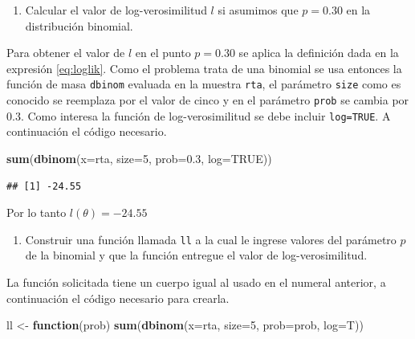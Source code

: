 \documentclass[10pt,]{krantz}
\makeatletter
\newenvironment{Shaded}{\begin{snugshade}}{\end{snugshade}}
\newcommand{\KeywordTok}[1]{\textcolor[rgb]{0.13,0.29,0.53}{\textbf{#1}}}
\newcommand{\DataTypeTok}[1]{\textcolor[rgb]{0.13,0.29,0.53}{#1}}
\newcommand{\DecValTok}[1]{\textcolor[rgb]{0.00,0.00,0.81}{#1}}
\newcommand{\FloatTok}[1]{\textcolor[rgb]{0.00,0.00,0.81}{#1}}
\newcommand{\StringTok}[1]{\textcolor[rgb]{0.31,0.60,0.02}{#1}}
\newcommand{\OtherTok}[1]{\textcolor[rgb]{0.56,0.35,0.01}{#1}}
\newcommand{\ControlFlowTok}[1]{\textcolor[rgb]{0.13,0.29,0.53}{\textbf{#1}}}
\newcommand{\NormalTok}[1]{#1}
\providecommand{\tightlist}{%
  \setlength{\itemsep}{0pt}\setlength{\parskip}{0pt}}
\newenvironment{kframe}{%
\medskip{}
\setlength{\fboxsep}{.8em}
 \def\at@end@of@kframe{}%
 \ifinner\ifhmode%
  \def\at@end@of@kframe{\end{minipage}}%
  \begin{minipage}{\columnwidth}%
 \fi\fi%
 \def\FrameCommand##1{\hskip\@totalleftmargin \hskip-\fboxsep
 \colorbox{shadecolor}{##1}\hskip-\fboxsep
     \hskip-\linewidth \hskip-\@totalleftmargin \hskip\columnwidth}%
 \MakeFramed {\advance\hsize-\width
   \@totalleftmargin\z@ \linewidth\hsize
   \@setminipage}}%
 {\par\unskip\endMakeFramed%
 \at@end@of@kframe}
\renewenvironment{Shaded}{\begin{kframe}}{\end{kframe}}
\makeatother
\begin{document}
\begin{enumerate}
\def\labelenumi{\arabic{enumi})}
\tightlist
\item
  Calcular el valor de log-verosimilitud \(l\) si asumimos que
  \(p=0.30\) en la distribución binomial.
\end{enumerate}

Para obtener el valor de \(l\) en el punto \(p=0.30\) se aplica la
definición dada en la expresión \eqref{eq:loglik}. Como el problema trata
de una binomial se usa entonces la función de masa \texttt{dbinom}
evaluada en la muestra \texttt{rta}, el parámetro \texttt{size} como es
conocido se reemplaza por el valor de cinco y en el parámetro
\texttt{prob} se cambia por 0.3. Como interesa la función de
log-verosimilitud se debe incluir \texttt{log=TRUE}. A continuación el
código necesario.

\begin{Shaded}
\begin{Highlighting}[]
\KeywordTok{sum}\NormalTok{(}\KeywordTok{dbinom}\NormalTok{(}\DataTypeTok{x=}\NormalTok{rta, }\DataTypeTok{size=}\DecValTok{5}\NormalTok{, }\DataTypeTok{prob=}\FloatTok{0.3}\NormalTok{, }\DataTypeTok{log=}\OtherTok{TRUE}\NormalTok{))}
\end{Highlighting}
\end{Shaded}

\begin{verbatim}
## [1] -24.55
\end{verbatim}

Por lo tanto \(l(\theta)= -24.55\)

\begin{enumerate}
\def\labelenumi{\arabic{enumi})}
\setcounter{enumi}{1}
\tightlist
\item
  Construir una función llamada \texttt{ll} a la cual le ingrese valores
  del parámetro \(p\) de la binomial y que la función entregue el valor
  de log-verosimilitud.
\end{enumerate}

La función solicitada tiene un cuerpo igual al usado en el numeral
anterior, a continuación el código necesario para crearla.

\begin{Shaded}
\begin{Highlighting}[]
\NormalTok{ll <-}\StringTok{ }\ControlFlowTok{function}\NormalTok{(prob) }\KeywordTok{sum}\NormalTok{(}\KeywordTok{dbinom}\NormalTok{(}\DataTypeTok{x=}\NormalTok{rta, }\DataTypeTok{size=}\DecValTok{5}\NormalTok{, }\DataTypeTok{prob=}\NormalTok{prob, }\DataTypeTok{log=}\NormalTok{T))}
\end{Highlighting}
\end{Shaded}
\end{document}
